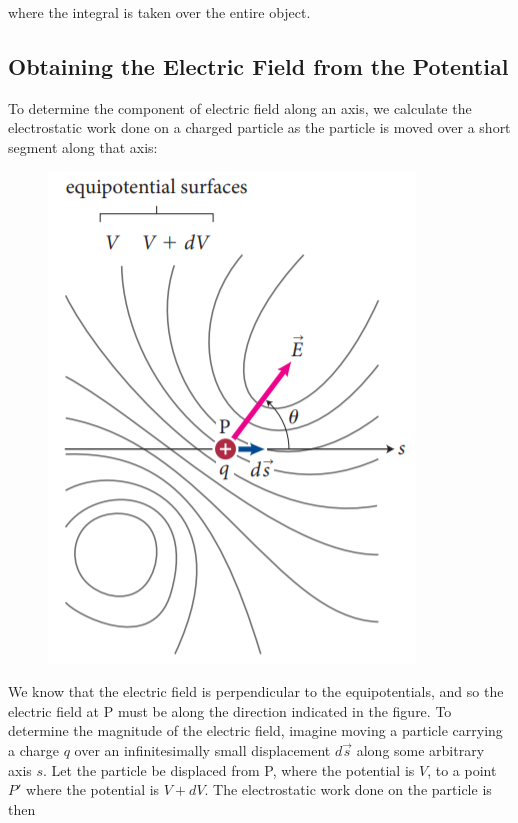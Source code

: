         where the integral is taken over the entire object.

    \subsection{Obtaining the Electric Field from the Potential}    %

        To determine the component of electric field along an axis, we calculate the electrostatic work done on a charged particle as the particle is moved over a short segment along that axis:

        \begin{figure}[hbt!]
            \centering
            \includegraphics[scale = 0.75]{Resources/25.6_Equipotential_Surfaces}
        \end{figure}

        We know that the electric field is perpendicular to the equipotentials, and so the electric field at P must be along the direction indicated in the figure. To determine the magnitude of the electric field, imagine
        moving a particle carrying a charge $q$ over an infinitesimally small displacement $d\vec{s}$ along some arbitrary axis $s$. Let the particle be displaced from P, where the potential is $V$, to a point $P'$ where
        the potential is $V+dV$. The electrostatic work done on the particle is then

